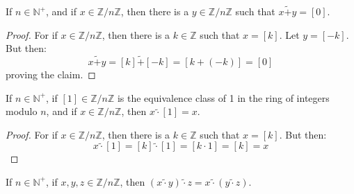     \begin{theorem}
        \label{thm:Additive_Inv_Mod_n}%
        If $n\in\mathbb{N}^{+}$, and if $x\in\mathbb{Z}/n\mathbb{Z}$,
        then there is a $y\in\mathbb{Z}/n\mathbb{Z}$ such that
        $x\tilde{+}y=[0]$.
    \end{theorem}
    \begin{proof}
        For if $x\in\mathbb{Z}/n\mathbb{Z}$, then there is a
        $k\in\mathbb{Z}$ such that $x=[k]$. Let $y=[\minus{k}]$. But
        then:
        \begin{equation}
            x\tilde{+}y=[k]\tilde{+}[\minus{k}]
            =[k+(\minus{k})]=[0]
        \end{equation}
        proving the claim.
    \end{proof}
    \begin{theorem}
        \label{thm:Equiv_Class_of_1_is_Mult_Identity_Mod_n}%
        If $n\in\mathbb{N}^{+}$, if $[1]\in\mathbb{Z}/n\mathbb{Z}$ is
        the equivalence class of 1 in the ring of integers modulo $n$,
        and if $x\in\mathbb{Z}/n\mathbb{Z}$, then $x\tilde{\cdot}[1]=x$.
    \end{theorem}
    \begin{proof}
        For if $x\in\mathbb{Z}/n\mathbb{Z}$, then there is a
        $k\in\mathbb{Z}$ such that $x=[k]$. But then:
        \begin{equation}
            x\tilde{\cdot}[1]=[k]\tilde{\cdot}[1]=[k\cdot{1}]=[k]=x
        \end{equation}
    \end{proof}
    \begin{theorem}
        \label{thm:Mod_Mult_is_Assoc}%
        If $n\in\mathbb{N}^{+}$, if $x,y,z\in\mathbb{Z}/n\mathbb{Z}$,
        then $(x\tilde{\cdot}y)\tilde{\cdot}z%
        =x\tilde{\cdot}(y\tilde{\cdot}z)$.
    \end{theorem}
